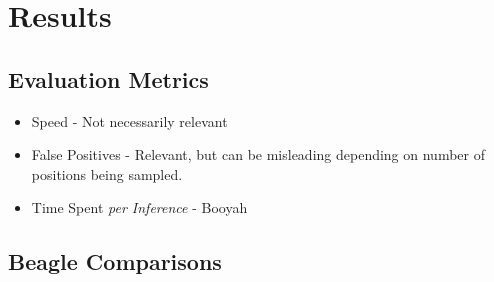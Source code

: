 \documentclass[10pt,xcolor={dvipsnames}]{beamer}
\begin{document}
\begin{NoHyper}
\begin{frame}
\end{frame}


\section{Results}

\subsection{Evaluation Metrics}
\begin{frame}
  \begin{itemize}
  \frametitle{Metrics for Analysing Indexing Performance}
  \item<1-> Speed - Not necessarily relevant
  \item<2-> False Positives - Relevant, but can be misleading depending on
  number of positions being sampled.
  \item<3-> Time Spent \emph{per Inference} - Booyah
  \end{itemize}
\end{frame}


\subsection{Beagle Comparisons}


\end{NoHyper}
\end{document}
